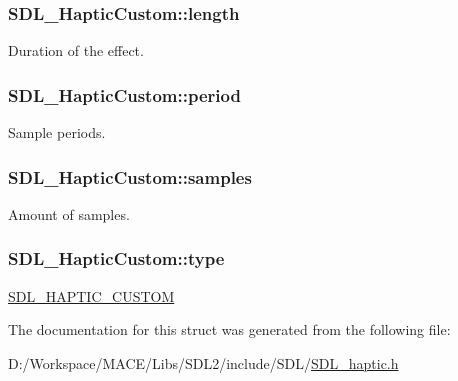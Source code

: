 \subsubsection[{\texorpdfstring{length}{length}}]{ S\+D\+L\+\_\+\+Haptic\+Custom\+::length}\hypertarget{struct_s_d_l___haptic_custom_ad70e8bc2cff74b99d704a757c16b363f}{}\label{struct_s_d_l___haptic_custom_ad70e8bc2cff74b99d704a757c16b363f}
Duration of the effect. 
\subsubsection[{\texorpdfstring{period}{period}}]{ S\+D\+L\+\_\+\+Haptic\+Custom\+::period}\hypertarget{struct_s_d_l___haptic_custom_aba7fafa808e90baddef25f009b8f4817}{}\label{struct_s_d_l___haptic_custom_aba7fafa808e90baddef25f009b8f4817}
Sample periods. 
\subsubsection[{\texorpdfstring{samples}{samples}}]{ S\+D\+L\+\_\+\+Haptic\+Custom\+::samples}\hypertarget{struct_s_d_l___haptic_custom_a5905ea1b6182da846535ca8c80b4fa33}{}\label{struct_s_d_l___haptic_custom_a5905ea1b6182da846535ca8c80b4fa33}
Amount of samples. 
\subsubsection[{\texorpdfstring{type}{type}}]{ S\+D\+L\+\_\+\+Haptic\+Custom\+::type}\hypertarget{struct_s_d_l___haptic_custom_a98a8995c94492069dc007502ed97eed2}{}\label{struct_s_d_l___haptic_custom_a98a8995c94492069dc007502ed97eed2}
\hyperlink{_s_d_l__haptic_8h_a8a18c4de1076ac9bebd718329d16db29}{S\+D\+L\+\_\+\+H\+A\+P\+T\+I\+C\+\_\+\+C\+U\+S\+T\+OM} 

The documentation for this struct was generated from the following file\+:\begin{DoxyCompactItemize}
\item 
D\+:/\+Workspace/\+M\+A\+C\+E/\+Libs/\+S\+D\+L2/include/\+S\+D\+L/\hyperlink{_s_d_l__haptic_8h}{S\+D\+L\+\_\+haptic.\+h}\end{DoxyCompactItemize}
